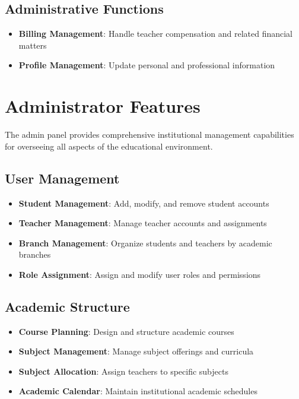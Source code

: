 \subsection{Administrative Functions}

\begin{itemize}
    \item \textbf{Billing Management}: Handle teacher compensation and related financial matters
    \item \textbf{Profile Management}: Update personal and professional information
\end{itemize}

\section{Administrator Features}

The admin panel provides comprehensive institutional management capabilities for overseeing all aspects of the educational environment.

\subsection{User Management}

\begin{itemize}
    \item \textbf{Student Management}: Add, modify, and remove student accounts
    \item \textbf{Teacher Management}: Manage teacher accounts and assignments
    \item \textbf{Branch Management}: Organize students and teachers by academic branches
    \item \textbf{Role Assignment}: Assign and modify user roles and permissions
\end{itemize}

\subsection{Academic Structure}

\begin{itemize}
    \item \textbf{Course Planning}: Design and structure academic courses
    \item \textbf{Subject Management}: Manage subject offerings and curricula
    \item \textbf{Subject Allocation}: Assign teachers to specific subjects
    \item \textbf{Academic Calendar}: Maintain institutional academic schedules
\end{itemize}

